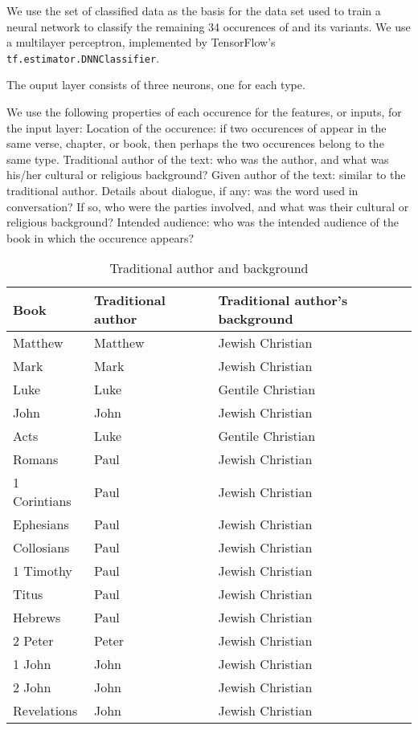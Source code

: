 \documentclass{article}
\newcommand{\entole}{\textepsilon\textnu\texttau\textomikron\textlambda\textepsilon\xspace}
\begin{document}
We use the set of classified data as the basis for the data set used to train a neural network to classify the remaining 34
occurences of \entole and its variants.  
We use a multilayer perceptron, implemented by TensorFlow's \texttt{tf.estimator.DNNClassifier}.

The ouput layer consists of three neurons, one for each type.

We use the following properties of each occurence for the features, or inputs, for the input layer:
Location of the occurence: if two occurences of \entole appear in the same verse, chapter, or book,
then perhaps the two occurences belong to the same type.  Traditional author of the text: who was
the author, and what was his/her cultural or religious background?  Given author of the text: similar
to the traditional author.  Details about dialogue, if any: was the word used in conversation?  If so,
who were the parties involved, and what was their cultural or religious background?  Intended audience:
who was the intended audience of the book in which the occurence appears?

\begin{table}
    \centering
    \renewcommand\arraystretch{1.3}
    \begin{tabular}{@{}lll@{}}
    \toprule
        Book & Traditional author & Traditional author's background \\
    \midrule
        Matthew & Matthew & Jewish Christian \\
        Mark & Mark & Jewish Christian \\
        Luke & Luke & Gentile Christian \\
        John & John & Jewish Christian \\
        Acts & Luke & Gentile Christian \\
        Romans & Paul & Jewish Christian \\
        1 Corintians & Paul & Jewish Christian \\
        Ephesians & Paul & Jewish Christian \\
        Collosians & Paul & Jewish Christian \\
        1 Timothy & Paul & Jewish Christian \\
        Titus & Paul & Jewish Christian \\
        Hebrews & Paul & Jewish Christian \\
        2 Peter & Peter & Jewish Christian \\
        1 John & John & Jewish Christian \\
        2 John & John & Jewish Christian \\
        Revelations & John & Jewish Christian \\
    \bottomrule
    \end{tabular}
    \caption{Traditional author and background}
    \label{traditionalauthor}
\end{table}
\end{document}
